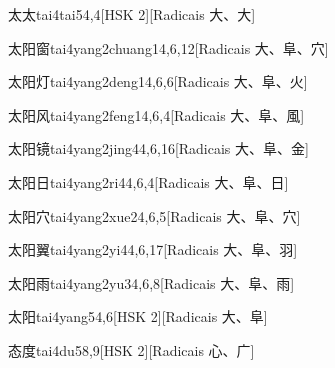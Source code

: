 \begin{entry}{太太}{tai4tai5}{4,4}[HSK 2][Radicais ⼤、⼤]
\end{entry}

\begin{entry}{太阳窗}{tai4yang2chuang1}{4,6,12}[Radicais ⼤、⾩、⽳]
\end{entry}

\begin{entry}{太阳灯}{tai4yang2deng1}{4,6,6}[Radicais ⼤、⾩、⽕]
\end{entry}

\begin{entry}{太阳风}{tai4yang2feng1}{4,6,4}[Radicais ⼤、⾩、⾵]
\end{entry}

\begin{entry}{太阳镜}{tai4yang2jing4}{4,6,16}[Radicais ⼤、⾩、⾦]
\end{entry}

\begin{entry}{太阳日}{tai4yang2ri4}{4,6,4}[Radicais ⼤、⾩、⽇]
\end{entry}

\begin{entry}{太阳穴}{tai4yang2xue2}{4,6,5}[Radicais ⼤、⾩、⽳]
\end{entry}

\begin{entry}{太阳翼}{tai4yang2yi4}{4,6,17}[Radicais ⼤、⾩、⽻]
\end{entry}

\begin{entry}{太阳雨}{tai4yang2yu3}{4,6,8}[Radicais ⼤、⾩、⾬]
\end{entry}

\begin{entry}{太阳}{tai4yang5}{4,6}[HSK 2][Radicais ⼤、⾩]
\end{entry}

\begin{entry}{态度}{tai4du5}{8,9}[HSK 2][Radicais ⼼、⼴]
\end{entry}

